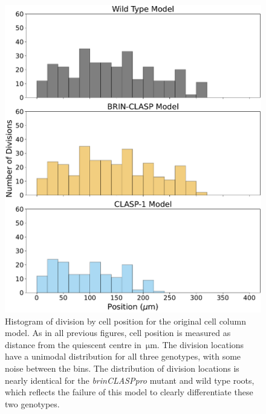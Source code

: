 \documentclass[referee,pdflatex,sn-mathphys-num]{sn-jnl}
\newcommand{\um}{\,\unit{\micro\metre}}
\begin{document}
\begin{appendices}
\begin{figure}[!htp]
  \centering
  \includegraphics[width=\textwidth]{column-original-histogram.pdf}
  \caption{Histogram of division by cell position for the original cell column model. As in all previous figures, cell position is measured as distance from the quiescent centre in $\um$. The division locations have a unimodal distribution for all three genotypes, with some noise between the bins. The distribution of division locations is nearly identical for the \emph{brinCLASPpro} mutant and wild type roots, which reflects the failure of this model to clearly differentiate these two genotypes.}
  \label{column-original-histogram}
\end{figure}


\end{appendices}
\end{document}
